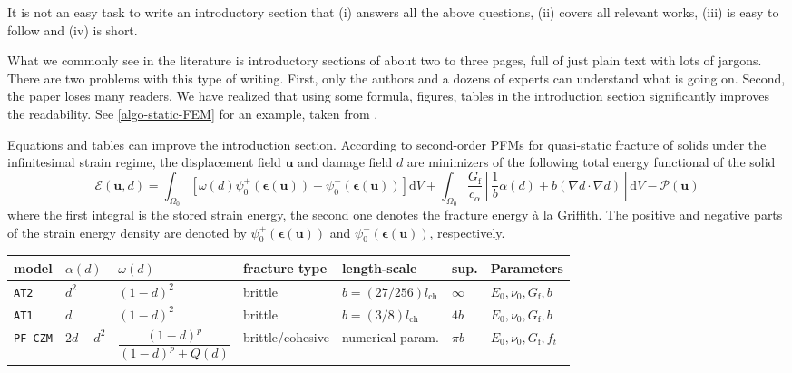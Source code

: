 \documentclass[authoryear,12pta4paper,fleqn]{article}
\newcommand{\bfepsilon}{\boldsymbol{\epsilon}}
\newcommand{\bfu}{\boldsymbol{u}}
\newcommand{\td}{\text{d}}
\numberwithin{equation}{section}
\theoremstyle{remark}
\begin{document}
It is not an easy task to write an introductory section that (i) answers all the above questions, (ii) covers all relevant works, (iii) is easy to follow and (iv) is short.

What we commonly see in the literature is introductory sections of about two to three pages, full of just plain text with lots of jargons. There are two problems with this type of writing. First, only the authors and a dozens of experts can understand what is going on. Second, the paper loses many readers. We have realized that using some formula, figures, tables in the introduction section significantly improves the readability.
See \cref{algo-static-FEM} for an example, taken from \cite{Mandal:EFM2019}.

\begin{MyBox}[label={algo-static-FEM}]
{Equations and tables can improve the introduction section.}
According to second-order PFMs for quasi-static fracture of solids under the infinitesimal strain regime, the displacement field $\bfu$ and damage field $d$ are minimizers of the following total energy functional of the solid 
\begin{equation*}
  \mathscr{E} (\bfu, d) 
    = \int_{\varOmega_{0}} \left[\omega(d)\psi_{0}^+(\bfepsilon (\bfu)) + \psi_{0}^-(\bfepsilon (\bfu)) \right]\td V
    + \int_{\varOmega_{0}}  \frac{G_\text{f}}{c_\alpha} \left[ \frac{1}{b} \alpha(d)
    + b \left( \nabla d \cdot \nabla d \right) \right] \td V
    - \mathscr{P} (\bfu)
\label{eq:3}
\end{equation*}
where the first integral is the stored strain energy, the second one denotes the fracture energy \`a la Griffith. The positive and negative parts of the strain energy density are denoted by $\psi_{0}^+(\bfepsilon (\bfu))$ and $\psi_{0}^-(\bfepsilon (\bfu))$, respectively.\\

 \begin{tabularx}{\textwidth}{lllllll}
   \toprule
 model & $\alpha(d)$ &  $\omega(d)$    & fracture type & length-scale & sup.  & Parameters\\
   \midrule     
  \texttt{AT2} & $d^2$  & $(1 - d)^{2}$  & brittle  & $b=(27/256) l_{\text{ch}}$ & $\infty$ & $E_0,\nu_0,G_\text{f},b$ \\
  \texttt{AT1} & $d$    & $(1 - d)^{2}$ &  brittle  & $b=(3/8) l_{\text{ch}}$ & $4b$  & $E_0,\nu_0,G_\text{f},b$\\
  \texttt{PF-CZM} & $2d-d^2$ & $\dfrac{(1 - d)^p}{(1 - d)^p + Q(d)}$ &  brittle/cohesive  & numerical param. & $\pi b$  & $E_0,\nu_0,G_\text{f},f_t$\\
   \bottomrule
 \end{tabularx}%
\end{MyBox}
\end{document}
